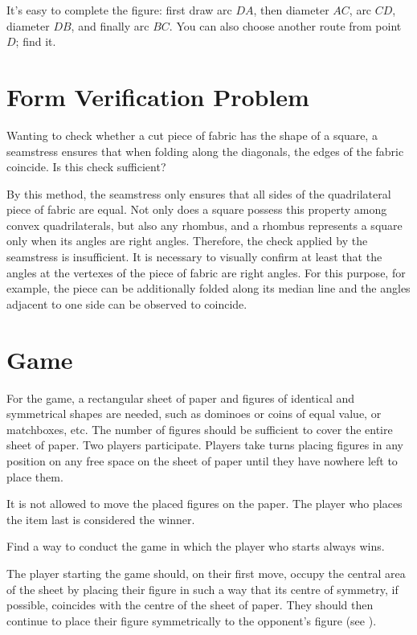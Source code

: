 It's easy to complete the figure: first draw arc $DA$, then diameter $AC$, arc $CD$, diameter $DB$, and finally arc $BC$. You can also choose another route from point $D$; find it.


\section{Form Verification Problem}
\label{sec-10.12}

\ques Wanting to check whether a cut piece of fabric has the shape of a square, a seamstress ensures that when folding along the diagonals, the edges of the fabric coincide. Is this check sufficient?

\ans By this method, the seamstress only ensures that all sides of the quadrilateral piece of fabric are equal. Not only does a square possess this property among convex quadrilaterals, but also any rhombus, and a rhombus represents a square only when its angles are right angles. Therefore, the check applied by the seamstress is insufficient. It is necessary to visually confirm at least that the angles at the vertexes of the piece of fabric are right angles. For this purpose, for example, the piece can be additionally folded along its median line and the angles adjacent to one side can be observed to coincide.
\clearpage
\section{Game}
\label{sec-10.13}

For the game, a rectangular sheet of paper and figures of identical and symmetrical shapes are needed, such as dominoes or coins of equal value, or matchboxes, etc. The number of figures should be sufficient to cover the entire sheet of paper. Two players participate. Players take turns placing figures in any position on any free space on the sheet of paper until they have nowhere left to place them.

It is not allowed to move the placed figures on the paper. The player who places the item last is considered the winner.



\ques Find a way to conduct the game in which the player who starts always wins.



\ans The player starting the game should, on their first move, occupy the central area of the sheet by placing their figure in such a way that its centre of symmetry, if possible, coincides with the centre of the sheet of paper. They should then continue to place their figure symmetrically to the opponent's figure (see ).


